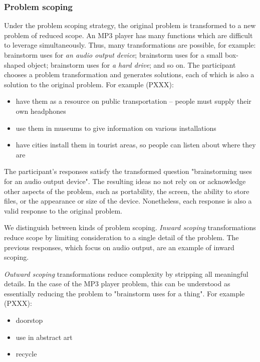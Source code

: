 \subsubsection{Problem scoping}

Under the problem scoping strategy, the original problem is transformed to a new problem of reduced scope.
An MP3 player has many functions which are difficult to leverage simultaneously. Thus, many transformations are possible, for example: brainstorm uses for \emph{an audio output device}; brainstorm uses for a small box-shaped object; brainstorm uses for \emph{a hard drive}; and so on. The participant chooses a problem transformation and generates solutions, each of which is also a solution to the original problem. For example (PXXX):

\begin{itemize}
    \item have them as a resource on public transportation -- people must supply their own headphones
    \item use them in museums to give information on various installations
    \item have cities install them in tourist areas, so people can listen about where they are
\end{itemize}

The participant's responses satisfy the transformed question "brainstorming uses for an audio output device". The resulting ideas no not rely on or acknowledge other aspects of the problem, such as portability, the screen, the ability to store files, or the appearance or size of the device. Nonetheless, each response is also a valid response to the original problem.

We distinguish between kinds of problem scoping. \emph{Inward scoping} transformations reduce scope by limiting consideration to a single detail of the problem. The previous responses, which focus on audio output, are an example of inward scoping.

\emph{Outward scoping} transformations reduce complexity by stripping all meaningful details. In the case of the MP3 player problem, this can be understood as essentially reducing the problem to "brainstorm uses for a thing". For example (PXXX):

\begin{itemize}
    \item doorstop
    \item use in abstract art
    \item recycle
\end{itemize}

